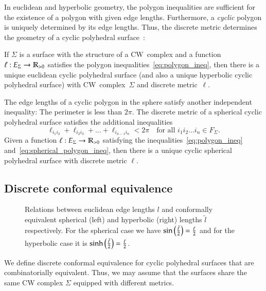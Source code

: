 \documentclass[Thesis]{subfiles}
\begin{document}
In euclidean and hyperbolic geometry, the polygon inequalities are sufficient for the existence of a polygon with given edge lengths. 
Furthermore, a \emph{cyclic} polygon is uniquely determined by its edge lengths. 
Thus, the discrete metric determines the geometry of a cyclic polyhedral surface~\cite{KSS15}:

If $\Sigma$ is a surface with the structure of a CW~complex and a function $\ell:E_{\Sigma}\rightarrow\mathbb R_{>0}$ satisfies the polygon inequalities~\eqref{eq:polygon_ineq}, then there is a unique euclidean
cyclic polyhedral surface (and also a unique hyperbolic cyclic polyhedral surface) with CW~complex~$\Sigma$ and discrete metric~$\ell$.

The edge lengths of a cyclic polygon in the sphere satisfy another independent inequality: The perimeter is less than $2\pi$.  
The discrete metric of a spherical cyclic polyhedral surface satisfies the additional inequalities
\begin{equation}
\label{eq:spherical_polygon_ineq}
\ell_{i_{1}i_{2}}+\ell_{i_{2}i_{3}}+\ldots+\ell_{i_{n-1}i_{n}}<2\pi
\quad
\text{for all $i_{1}i_{2}\ldots i_{n}\in F_{\Sigma}$.}
\end{equation}
Given a function $\ell:E_{\Sigma}\rightarrow\mathbb R_{>0}$ satisfying the inequalities~\eqref{eq:polygon_ineq}
and~\eqref{eq:spherical_polygon_ineq}, then there is a unique cyclic spherical polyhedral surface with discrete metric $\ell$.

\subsection{Discrete conformal equivalence}
\label{sec:discr-conf-equiv}

\begin{figure}
\centering
\resizebox{0.6\textwidth}{!}{


}
\caption{
Relations between euclidean edge lengths $l$ and conformally equivalent spherical (left) and hyperbolic (right) lengths $\tilde l$ respectively. 
For the spherical case we have $\sin\Big(\frac{\tilde{\ell}}{2}\Big)=\frac{\ell}{2}$ and for the hyperbolic case it is $\sinh\Big(\frac{\tilde{\ell}}{2}\Big)=\frac{\ell}{2}$.
}
\label{fig:geometries}
\end{figure}


We define discrete conformal equivalence for cyclic polyhedral surfaces that are combinatorially equivalent. Thus, we may assume that the surfaces share the same CW complex $\Sigma$ equipped with different metrics.
\end{document}
